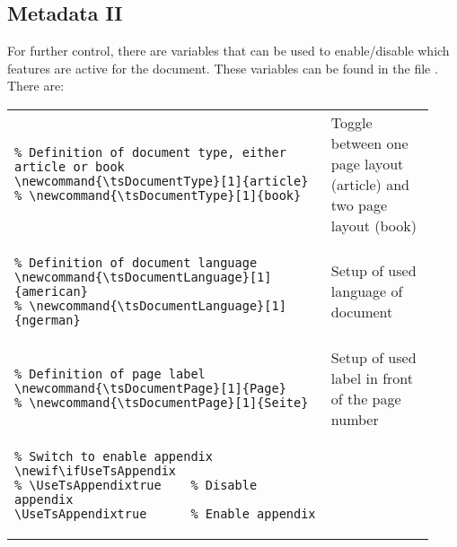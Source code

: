 \subsection{Metadata II}\label{subsec:Metadata-II}

For further control, there are variables that can be used to enable/disable
which features are active for the document. These variables can be found
in the file . There are:

\begin{footnotesize}
    \renewcommand*{\arraystretch}{1.5}
    \begin{longtable}{ | P{0.7\linewidth} | p{0.23\linewidth} | }
        \hline
         &                                            \\
        \hline
        \begin{BVerbatim}
\newcommand{\tsDocumentType}[1]{article}
        \end{BVerbatim}
         & Toggle between one page layout (article) and two page layout (book) \\
        \hline
        \begin{BVerbatim}
\newcommand{\tsDocumentLanguage}[1]{american}
        \end{BVerbatim}
         & Setup of used language of document                                  \\
        \hline
        \begin{BVerbatim}
\newcommand{\tsDocumentPage}[1]{Page}
        \end{BVerbatim}
         & Setup of used label in front of the page number                     \\
        \hline
        \begin{BVerbatim}
\newif\ifUseTsAppendix
\UseTsAppendixtrue      %
        \end{BVerbatim}

\end{longtable}
\end{footnotesize}
